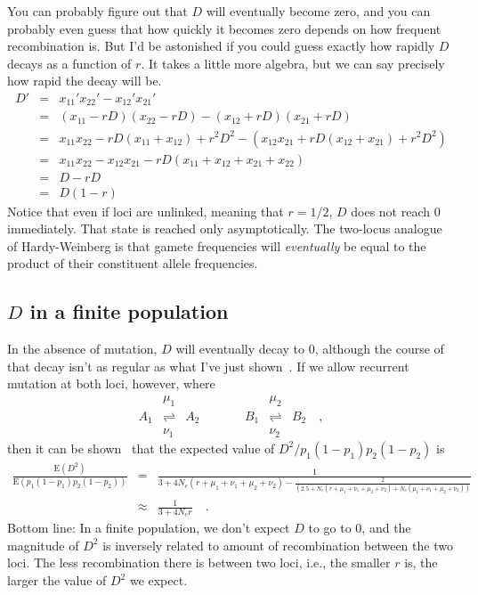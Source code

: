 You can probably figure out that $D$ will eventually become zero, and
you can probably even guess that how quickly it becomes zero depends
on how frequent recombination is. But I'd be astonished if you could
guess exactly how rapidly $D$ decays as a function of $r$.  It takes a
little more algebra, but we can say precisely how rapid the decay will
be.
\begin{eqnarray*}
D' &=& x_{11}'x_{22}' - x_{12}'x_{21}' \\
   &=& (x_{11} - rD)(x_{22} - rD) - (x_{12} + rD)(x_{21} + rD) \\
   &=& x_{11}x_{22} - rD(x_{11} + x_{12}) + r^2D^2
       - (x_{12}x_{21} + rD(x_{12} + x_{21}) + r^2D^2) \\
   &=& x_{11}x_{22} - x_{12}x_{21} - rD(x_{11} + x_{12} + x_{21} + x_{22}) \\
   &=& D - rD \\
   &=& D(1-r)
\end{eqnarray*}
Notice that even if loci are unlinked, meaning that $r = 1/2$, $D$
does not reach 0 immediately. That state is reached only
asymptotically. The two-locus analogue of Hardy-Weinberg is that
gamete frequencies will {\it eventually\/} be equal to the product of
their constituent allele frequencies.

\subsection*{$D$ in a finite population}

In the absence of mutation, $D$ will eventually decay to 0, although
the course of that decay isn't as regular as what I've just
shown~\cite{Hill-Robertson-1968}. If we allow recurrent mutation at
both loci, however, where
\[
\begin{array}{ccccccc}
    &\mu_1            &     &      &     &\mu_2 \\
A_1 &\rightleftharpoons& A_2 &\qquad& B_1 &\rightleftharpoons& B_2
\quad , \\
    &\nu_1            &     &      &     &\nu_2 
\end{array}
\]
then it can be shown~\cite{Ohta-Kimura-1969} that the expected value
of $D^2/p_1(1-p_1)p_2(1-p_2)$ is 
{\scriptsize
\begin{eqnarray*}
\frac{\mbox{E}(D^2)}{\mbox{E}(p_1(1-p_1)p_2(1-p_2))}
&=& \frac{1}{3 + 4N_e(r+\mu_1+\nu_1+\mu_2+\nu_2)
                           - \frac{2}{(2.5 + N_e(r+\mu_1+\nu_1+\mu_2+\nu_2)
                              + N_e(\mu_1+\nu_1+\mu_2+\nu_2))}} \\
&\approx& \frac{1}{3 + 4N_er} \quad .
\end{eqnarray*}
}
\noindent Bottom line: In a finite population, we don't expect $D$ to
go to 0, and the magnitude of $D^2$ is inversely related to amount of
recombination between the two loci. The less recombination there is
between two loci, i.e., the smaller $r$ is, the larger the value of
$D^2$ we expect.

